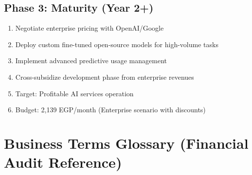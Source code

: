 \documentclass[11pt,a4paper]{article}
\begin{document}
\subsection{Phase 3: Maturity (Year 2+)}

\begin{enumerate}[leftmargin=2em]
    \item Negotiate enterprise pricing with OpenAI/Google
    \item Deploy custom fine-tuned open-source models for high-volume tasks
    \item Implement advanced predictive usage management
    \item Cross-subsidize development phase from enterprise revenues
    \item Target: Profitable AI services operation
    \item Budget: 2,139 EGP/month (Enterprise scenario with discounts)
\end{enumerate}

\newpage

\section{Business Terms Glossary (Financial Audit Reference)}
\end{document}
